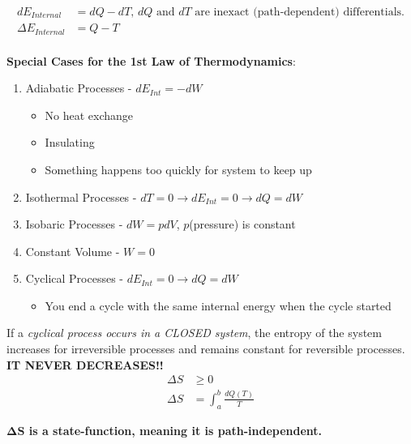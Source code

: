 \begin{definition}\label{def:1st Law of Thermo}
  \begin{equation}\label{eq:1st Law of Thermo}
    \begin{aligned}
      dE_{Internal} &= dQ - dT \text{, } dQ \text{ and } dT \text{ are inexact	(path-dependent) differentials.} \\
      \Delta E_{Internal} &= Q-T \\
    \end{aligned}
  \end{equation}
  \begin{note}\label{note:1st Law of Thermo Special Cases}
    \textbf{Special Cases for the 1st Law of Thermodynamics}:
    \begin{enumerate}
    \item Adiabatic Processes - $dE_{Int} = -dW$
      \begin{itemize}[noitemsep, nolistsep]
      \item No heat exchange
      \item Insulating
      \item Something happens too quickly for system to keep up
      \end{itemize}
    \item Isothermal Processes - $dT = 0 \rightarrow dE_{Int} = 0 \rightarrow dQ = dW$
    \item Isobaric Processes - $dW = pdV$, $p$(pressure) is constant
    \item Constant Volume - $W = 0$
    \item Cyclical Processes - $dE_{Int} = 0 \rightarrow dQ = dW$
      \begin{itemize}[noitemsep, nolistsep]
      \item You end a cycle with the same internal energy when the cycle started
      \end{itemize}
    \end{enumerate}
  \end{note}
\end{definition}
\begin{definition}\label{def:2nd Law of Thermo}
  If a \emph{cyclical process occurs in a CLOSED system}, the entropy of the system increases for irreversible processes and remains constant for reversible processes. \textbf{IT NEVER DECREASES!!}
  \begin{align}\label{eq:2nd Law of Thermo}
    \Delta S &\geq 0 \\
    \Delta S &= \int_{a}^{b} \frac{dQ \left( T \right)}{T}
  \end{align}
  \begin{note}
    \textbf{$\mathbf{\Delta S}$ is a state-function, meaning it is path-independent.}
  \end{note}
\end{definition}

